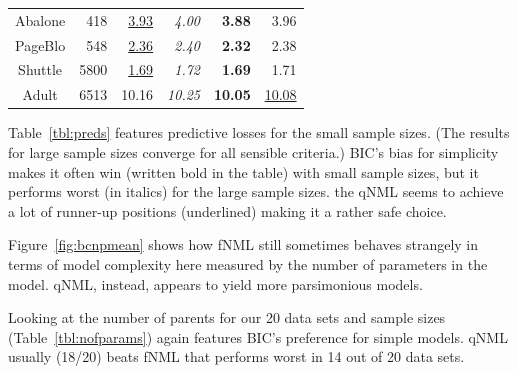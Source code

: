 \begin{table}
\begin{center}
\begin{tabular}{crrrrr}
 Abalone &   418 &  \underline{3.93} &     \textit{4.00} &      \textbf{3.88} &               3.96 \\
 PageBlo &   548 &  \underline{2.36} &     \textit{2.40} &      \textbf{2.32} &               2.38 \\
 Shuttle &  5800 &  \underline{1.69} &     \textit{1.72} &      \textbf{1.69} &               1.71 \\
   Adult &  6513 &             10.16 &    \textit{10.25} &     \textbf{10.05} &  \underline{10.08} \\
\end{tabular}
\end{center}
\end{table}

Table~\ref{tbl:preds} features predictive losses for the small sample
sizes.  (The results for large sample sizes converge for all sensible
criteria.) BIC's bias for simplicity makes it often win (written bold
in the table) with small sample sizes, but it performs worst (in
italics) for the large sample sizes. the qNML seems to achieve a lot
of runner-up positions (underlined) making it a rather safe choice.

Figure~\ref{fig:bcnpmean} shows how fNML still sometimes behaves
strangely in terms of model complexity here measured by the number of
parameters in the model. qNML, instead, appears to yield more
parsimonious models.

Looking at the number of parents for our 20 data sets and sample
sizes (Table~\ref{tbl:nofparams}) again features BIC's preference for
simple models. qNML usually (18/20) beats fNML that performs worst in
14 out of 20 data sets.

